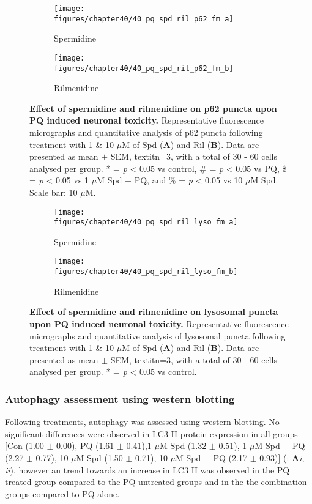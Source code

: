 \begin{figure}[!htbp]
  \center
  \begin{subfigure}[b]{0.495\linewidth}
    \texttt{[image: figures/chapter40/40\_pq\_spd\_ril\_p62\_fm\_a]}
    \caption{Spermidine}
  \end{subfigure}
  \begin{subfigure}[b]{0.495\linewidth}
    \texttt{[image: figures/chapter40/40\_pq\_spd\_ril\_p62\_fm\_b]}
    \caption{Rilmenidine}
  \end{subfigure}
  \caption[Effect of spermidine and rilmenidine on p62 puncta upon PQ induced neuronal toxicity]{\textbf{Effect of spermidine and rilmenidine on p62 puncta upon PQ induced neuronal toxicity.} Representative fluorescence micrographs and quantitative analysis of p62 puncta following treatment with 1 \& 10 $\mu$M of Spd (\textbf{A}) and Ril (\textbf{B}). Data are presented as mean $\pm$ SEM, textit{n}=3, with a total of 30 - 60 cells analysed per group. * = \textit{p} < 0.05 vs control, \# = \textit{p} < 0.05 vs PQ, \$ = \textit{p} < 0.05 vs 1 $\mu$M Spd + PQ, and \% = \textit{p} < 0.05 vs 10 $\mu$M Spd. Scale bar: 10 $\mu$M.}
  \label{fig:40_pq_spd_ril_p62_fm_a}
\end{figure}

\begin{figure}[!htbp]
  \center
  \begin{subfigure}[b]{0.495\linewidth}
    \texttt{[image: figures/chapter40/40\_pq\_spd\_ril\_lyso\_fm\_a]}
    \caption{Spermidine}
  \end{subfigure}
  \begin{subfigure}[b]{0.495\linewidth}
    \texttt{[image: figures/chapter40/40\_pq\_spd\_ril\_lyso\_fm\_b]}
    \caption{Rilmenidine}
  \end{subfigure}
  \caption[Effect of spermidine and rilmenidine on lysosomal puncta upon PQ induced neuronal toxicity]{\textbf{Effect of spermidine and rilmenidine on lysosomal puncta upon PQ induced neuronal toxicity.} Representative fluorescence micrographs and quantitative analysis of lysosomal puncta following treatment with 1 \& 10 $\mu$M of Spd (\textbf{A}) and Ril (\textbf{B}). Data are presented as mean $\pm$ SEM, textit{n}=3, with a total of 30 - 60 cells analysed per group. * = \textit{p} < 0.05 vs control.}
  \label{fig:40_pq_spd_ril_lyso_fm_a}
\end{figure}

\subsubsection{Autophagy assessment using western blotting}
Following treatments, autophagy was assessed using western blotting. No significant differences were observed in LC3-II protein expression in all groups [Con (1.00 $\pm$ 0.00), PQ (1.61 $\pm$ 0.41),1 $\mu$M Spd (1.32 $\pm$ 0.51), 1 $\mu$M Spd + PQ (2.27 $\pm$ 0.77), 10 $\mu$M Spd (1.50 $\pm$ 0.71), 10 $\mu$M Spd + PQ (2.17 $\pm$ 0.93)] (: \textbf{A}\textit{i}, \textit{ii}), however an trend towards an increase in LC3 II was observed in the PQ treated group compared to the PQ untreated groups and in the the combination groups compared to PQ alone.

